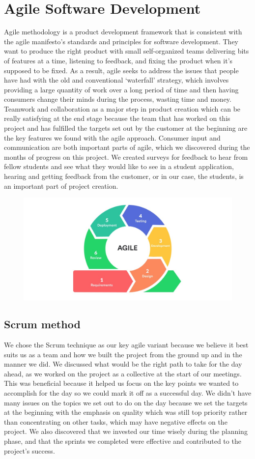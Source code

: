 \section{Agile Software Development}

Agile methodology is a product development framework that is consistent with the agile manifesto's standards and principles for software development. They want to produce the right product with small self-organized teams delivering bits of features at a time, listening to feedback, and fixing the product when it's supposed to be fixed. As a result, agile seeks to address the issues that people have had with the old and conventional ‘waterfall' strategy, which involves providing a large quantity of work over a long period of time and then having consumers change their minds during the process, wasting time and money. Teamwork and collaboration as a major step in product creation which can be really satisfying at the end stage because the team that has worked on this project and has fulfilled the targets set out by the customer at the beginning are the key features we found with the agile approach. Consumer input and communication are both important parts of agile, which we discovered during the months of progress on this project. We created surveys for feedback to hear from fellow students and see what they would like to see in a student application, hearing and getting feedback from the customer, or in our case, the students, is an important part of project creation.

\hfill \break

\begin{figure}
    \centering
    \includegraphics[width=.4\textwidth, inner]{images/87.jpg}
    \caption{ }
    \label{fig:my_label}
\end{figure}

\subsection{Scrum method}

We chose the Scrum\cite{ref15} technique as our key agile variant because we believe it best suits us as a team and how we built the project from the ground up and in the manner we did. We discussed what would be the right path to take for the day ahead, as we worked on the project as a collective at the start of our meetings. This was beneficial because it helped us focus on the key points we wanted to accomplish for the day so we could mark it off as a successful day. We didn't have many issues on the topics we set out to do on the day because we set the targets at the beginning with the emphasis on quality which was still top priority rather than concentrating on other tasks, which may have negative effects on the project. We also discovered that we invested our time wisely during the planning phase, and that the sprints we completed were effective and contributed to the project's success.

